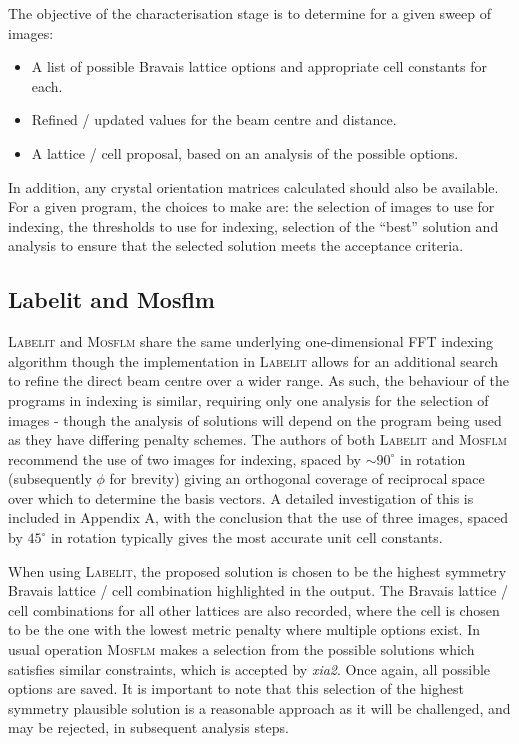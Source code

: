 \documentclass[a4paper, 11pt]{article}
\begin{document}
The objective of the characterisation stage is to determine for a
given sweep of images: 

\begin{itemize}
\item{A list of possible Bravais lattice options and appropriate cell
    constants for each.}
\item{Refined / updated values for the beam centre and distance.}
\item{A lattice / cell proposal, based on an analysis of the possible
    options.}
\end{itemize}

\noindent
In addition, any crystal orientation
matrices calculated
should also be available. For a given program, the choices to make
are: the selection of images to use for indexing, the thresholds to
use for indexing, selection of the ``best'' solution and analysis to
ensure that the selected solution meets the acceptance criteria. 

\subsection{Labelit and Mosflm}

\textsc{Labelit} and \textsc{Mosflm} share the same underlying
one-dimensional FFT indexing algorithm \cite{Steller:mf0013} though the
implementation in \textsc{Labelit} allows for an additional search to refine
the direct beam centre over a wider range. As such, the behaviour of
the programs in indexing is similar, requiring only one analysis for
the selection of images - though the analysis of solutions will depend
on the program being used as they have differing penalty schemes.
The authors of both \textsc{Labelit} and \textsc{Mosflm} recommend the
use of two images for indexing, spaced by $\sim 90^{\circ}$ in
rotation (subsequently $\phi$ for 
brevity) giving an orthogonal coverage of 
reciprocal space over which to determine the basis vectors. A detailed
investigation of this is included in Appendix A, with the conclusion
that the use of three images, spaced by $45^{\circ}$ in rotation
typically gives the most accurate unit cell constants.

When using \textsc{Labelit}, the proposed solution is chosen to be the
highest symmetry 
Bravais lattice / cell combination highlighted in the output. The
Bravais lattice / cell combinations for all other lattices are also
recorded, where the cell is chosen to be the one with the lowest
metric penalty where multiple options exist. In usual operation \textsc{Mosflm}
makes a selection from the possible solutions which satisfies similar
constraints, which is accepted by \emph{xia2}. Once again, all possible
options are saved. It is important to note that this selection of the
highest symmetry plausible solution is a reasonable approach as it will be
challenged, and may be rejected, in subsequent analysis steps.
\end{document}
